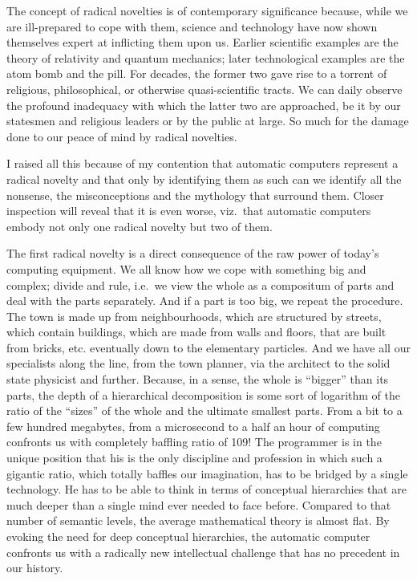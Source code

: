 \documentclass[a4paper,12pt]{article}
\begin{document}
The concept of radical novelties is of contemporary significance
because, while we are ill-prepared to cope with them, science and
technology have now shown themselves expert at inflicting them upon us.
Earlier scientific examples are the theory of relativity and quantum
mechanics; later technological examples are the atom bomb and the pill.
For decades, the former two gave rise to a torrent of religious,
philosophical, or otherwise quasi-scientific tracts.  We can daily
observe the profound inadequacy with which the latter two are
approached, be it by our statesmen and religious leaders or by the
public at large.  So much for the damage done to our peace of mind by
radical novelties.

I raised all this because of my contention that automatic computers
represent a radical novelty and that only by identifying them as such
can we identify all the nonsense, the misconceptions and the mythology
that surround them.  Closer inspection will reveal that it is even
worse, viz.\ that automatic computers embody not only one radical
novelty but two of them.

The first radical novelty is a direct consequence of the raw power of
today's computing equipment.  We all know how we cope with something big
and complex; divide and rule, i.e.\ we view the whole as a compositum of
parts and deal with the parts separately.  And if a part is too big, we
repeat the procedure.  The town is made up from neighbourhoods, which
are structured by streets, which contain buildings, which are made from
walls and floors, that are built from bricks, etc.  eventually down to
the elementary particles.  And we have all our specialists along the
line, from the town planner, via the architect to the solid state
physicist and further.  Because, in a sense, the whole is ``bigger''
than its parts, the depth of a hierarchical decomposition is some sort
of logarithm of the ratio of the ``sizes'' of the whole and the ultimate
smallest parts.  From a bit to a few hundred megabytes, from a
microsecond to a half an hour of computing confronts us with completely
baffling ratio of 109! The programmer is in the unique position that his
is the only discipline and profession in which such a gigantic ratio,
which totally baffles our imagination, has to be bridged by a single
technology.  He has to be able to think in terms of conceptual
hierarchies that are much deeper than a single mind ever needed to face
before.  Compared to that number of semantic levels, the average
mathematical theory is almost flat.  By evoking the need for deep
conceptual hierarchies, the automatic computer confronts us with a
radically new intellectual challenge that has no precedent in our
history.
\end{document}
